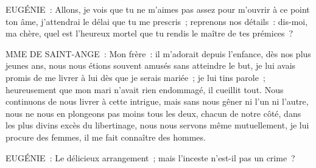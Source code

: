 \documentclass[french,twoside]{book} %
\begin{document}
EUGÉNIE : Allons, je vois que tu ne m’aimes pas assez pour m’ouvrir à ce point ton âme, j’attendrai le délai que tu me prescris ; reprenons nos détails : dis-moi, ma chère, quel est l’heureux mortel que tu rendis le maître de tes prémices ?\par
MME DE SAINT-ANGE : Mon frère : il m’adorait depuis l’enfance, dès nos plus jeunes ans, nous nous étions souvent amusés sans atteindre le but, je lui avais promis de me livrer à lui dès que je serais mariée ; je lui tins parole ; heureusement que mon mari n’avait rien endommagé, il cueillit tout. Nous continuons de nous livrer à cette intrigue, mais sans nous gêner ni l’un ni l’autre, nous ne nous en plongeons pas moins tous les deux, chacun de notre côté, dans les plus divins excès du libertinage, nous nous servons même mutuellement, je lui procure des femmes, il me fait connaître des hommes.\par
EUGÉNIE : Le délicieux arrangement ; mais l’inceste n’est-il pas un crime ?\par
\end{document}

